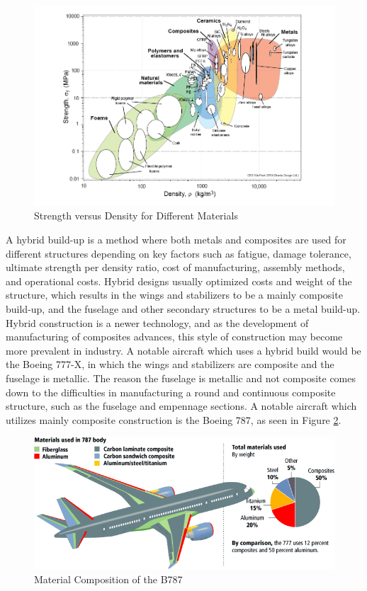 \begin{figure}[!h]
    \centering
    \includegraphics[width=\linewidth]{Photos/strength_density.png}
    \caption{Strength versus Density for Different Materials \cite{ashby}}
    \label{fig:strength_density}
\end{figure}

A hybrid build-up is a method where both metals and composites are used for different structures depending on key factors such as fatigue, damage tolerance, ultimate strength per density ratio, cost of manufacturing, assembly methods, and operational costs. Hybrid designs usually optimized costs and weight of the structure, which results in the wings and stabilizers to be a mainly composite build-up, and the fuselage and other secondary structures to be a metal build-up. Hybrid construction is a newer technology, and as the development of manufacturing of composites advances, this style of construction may become more prevalent in industry. A notable aircraft which uses a hybrid build would be the Boeing 777-X, in which the wings and stabilizers are composite and the fuselage is metallic. The reason the fuselage is metallic and not composite comes down to the difficulties in manufacturing a round and continuous composite structure, such as the fuselage and empennage sections. A notable aircraft which utilizes mainly composite construction is the Boeing 787, as seen in Figure \ref{fig:787 materials}.

\begin{figure}[!h]
    \centering
    \includegraphics[width=\linewidth]{Photos/787 Materials.png}
    \caption{Material Composition of the B787 \cite{787_Mat}}
    \label{fig:787 materials}
\end{figure}

